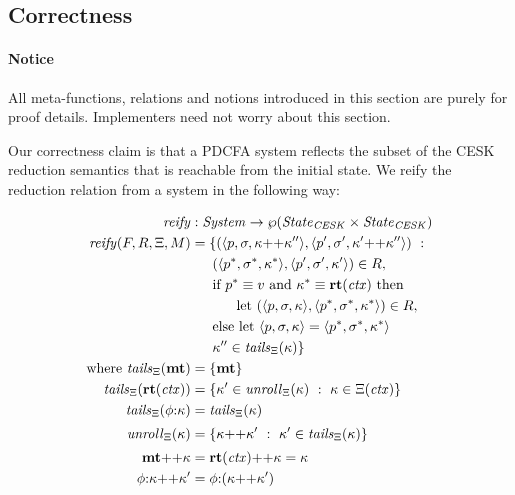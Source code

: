 \subsection{Correctness}

\paragraph{Notice} All meta-functions, relations and notions introduced in this section are purely for proof details.
%
Implementers need not worry about this section.

Our correctness claim is that a PDCFA system reflects the subset of the CESK reduction semantics that is reachable from the initial state.
%
We reify the reduction relation from a system in the following way:

\begin{align*}
  \reify &: \mathit{System} \to \wp(\mathit{State}_\mathit{CESK} \times \mathit{State}_\mathit{CESK}) \\
  \reify(F, R, \mktab, \mmemo) &=
  \setbuild{(\tpl{\mpoint,\mstore,\append{\mkont}{\mkont''}},
             \tpl{\mpoint',\mstore',\append{\mkont'}{\mkont''}})}
           {\\ &\phantom{= \{}(\tpl{\mpoint^*,\mstore^*,\mkont^*}, \tpl{\mpoint',\mstore',\mkont'}) \in R,
            \\ &\phantom{= \{}\text{if } \mpoint^*\equiv\mval \text{ and } \mkont^* \equiv \krt{\mctx} \text{ then }
            \\ &\phantom{= \{else }\text{let } (\tpl{\mpoint,\mstore,\mkont},\tpl{\mpoint^*,\mstore^*,\mkont^*}) \in R,
            \\ &\phantom{= \{}\text{else let } \tpl{\mpoint,\mstore,\mkont} = \tpl{\mpoint^*,\mstore^*,\mkont^*}
            \\ &\phantom{= \{}\mkont'' \in \tails{\mktab}{\mkont}} \\
\text{where } \tails{\mktab}{\kmt} &= \set{\kmt} \\
              \tails{\mktab}{\krt{\mctx}} &= \setbuild{\mkont' \in \unroll{\mktab}{\mkont}}{\mkont \in \mktab(\mctx)} \\
              \tails{\mktab}{\kcons{\mkframe}{\mkont}} &= \tails{\mktab}{\mkont}
\\[2pt]
              \unroll{\mktab}{\mkont} &= \setbuild{\append{\mkont}{\mkont'}}{\mkont' \in \tails{\mktab}{\mkont}}
\\[2pt]
              \append{\kmt}{\mkont} &= \append{\krt{\mctx}}{\mkont} = \mkont \\
              \append{\kcons{\mkframe}{\mkont}}{\mkont'} &= \kcons{\mkframe}{(\append{\mkont}{\mkont'})}
\end{align*}

